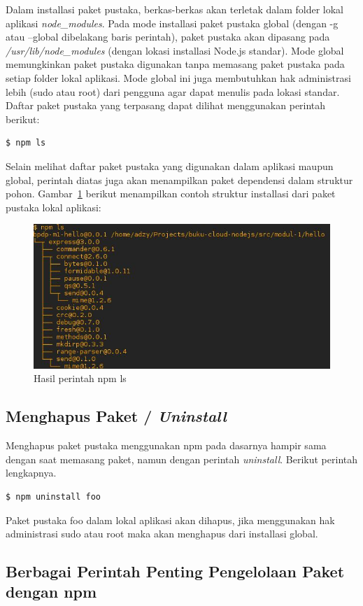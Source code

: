 Dalam installasi paket pustaka, berkas-berkas akan terletak dalam folder lokal aplikasi \textit{node\_modules}. Pada mode installasi paket pustaka global (dengan -g atau --global dibelakang baris perintah), paket pustaka akan dipasang pada \textit{/usr/lib/node\_modules} (dengan lokasi installasi Node.js standar). Mode global memungkinkan paket pustaka digunakan tanpa memasang paket pustaka pada setiap folder lokal aplikasi. Mode global ini juga membutuhkan hak administrasi lebih (sudo atau root) dari pengguna agar dapat menulis pada lokasi standar. Daftar paket pustaka yang terpasang dapat dilihat menggunakan perintah berikut:

\lstset{language=bash,caption=Argumen npm untuk melihat daftar paket terpasang}
\begin{lstlisting}
$ npm ls
\end{lstlisting}

Selain melihat daftar paket pustaka yang digunakan dalam aplikasi maupun global, perintah diatas juga akan menampilkan paket dependensi dalam struktur pohon. Gambar~\ref{fig:npmls} berikut menampilkan contoh struktur installasi dari paket pustaka lokal aplikasi:

  \begin{figure}
    \begin{center}
      \includegraphics[scale=0.5]{images/npmls.jpg}
    \end{center}
    \caption{Hasil perintah npm ls}
    \label{fig:npmls}
  \end{figure}

\subsection{Menghapus Paket / \textit{Uninstall}}

Menghapus paket pustaka menggunakan npm pada dasarnya hampir sama dengan saat memasang paket, namun dengan perintah \textit{uninstall}. Berikut perintah lengkapnya.

\lstset{language=bash,caption=Perintah menghapus paket di npm}
\begin{lstlisting}
$ npm uninstall foo
\end{lstlisting}

Paket pustaka foo dalam lokal aplikasi akan dihapus, jika menggunakan hak administrasi sudo atau root maka akan menghapus dari installasi global.

\subsection{Berbagai Perintah Penting Pengelolaan Paket dengan npm}

